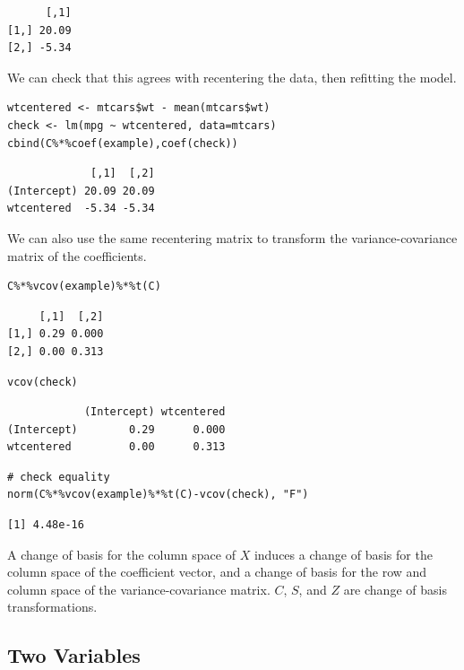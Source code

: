 \documentclass[]{article}
\begin{document}
\begin{verbatim}
      [,1]
[1,] 20.09
[2,] -5.34
\end{verbatim}

We can check that this agrees with recentering the data, then refitting
the model.

\begin{verbatim}
wtcentered <- mtcars$wt - mean(mtcars$wt)
check <- lm(mpg ~ wtcentered, data=mtcars)
cbind(C%*%coef(example),coef(check))
\end{verbatim}

\begin{verbatim}
             [,1]  [,2]
(Intercept) 20.09 20.09
wtcentered  -5.34 -5.34
\end{verbatim}

We can also use the same recentering matrix to transform the
variance-covariance matrix of the coefficients.

\begin{verbatim}
C%*%vcov(example)%*%t(C)
\end{verbatim}

\begin{verbatim}
     [,1]  [,2]
[1,] 0.29 0.000
[2,] 0.00 0.313
\end{verbatim}

\begin{verbatim}
vcov(check)
\end{verbatim}

\begin{verbatim}
            (Intercept) wtcentered
(Intercept)        0.29      0.000
wtcentered         0.00      0.313
\end{verbatim}

\begin{verbatim}
# check equality
norm(C%*%vcov(example)%*%t(C)-vcov(check), "F")
\end{verbatim}

\begin{verbatim}
[1] 4.48e-16
\end{verbatim}

A change of basis for the column space of \(X\) induces a change of
basis for the column space of the coefficient vector, and a change of
basis for the row and column space of the variance-covariance matrix.
\(C\), \(S\), and \(Z\) are change of basis transformations.

\hypertarget{two-variables}{%
\subsection{Two Variables}\label{two-variables}}
\end{document}
